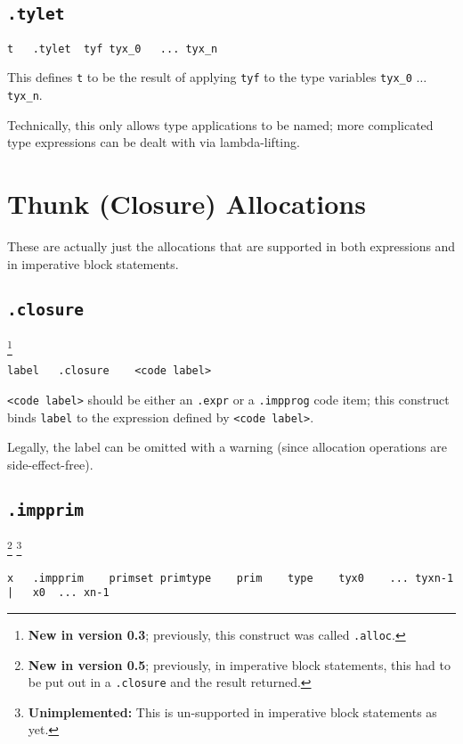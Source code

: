 \documentclass{report}
\newcommand\stringcode[1]{\texttt{#1}}
\newcommand\unimpl[1]{\footnote{\textbf{Unimplemented: }#1}}
\newcommand\new[2]{\footnote{\textbf{New in version #1}; previously, #2}}
\begin{document}
\subsection{\stringcode{.tylet}}

\begin{verbatim}
t	.tylet	tyf	tyx_0	...	tyx_n
\end{verbatim}

This defines \stringcode{t} to be the result of applying \stringcode{tyf} to the type variables \stringcode{tyx\_0} $\ldots$ \stringcode{tyx\_n}.

Technically, this only allows type applications to be named;
more complicated type expressions can be dealt with via lambda-lifting.

\section{Thunk (Closure) Allocations}
\label{thunk_alloc}

These are actually just the allocations that are supported in both expressions and in imperative block statements.

\subsection{\stringcode{.closure}}
\new{0.3}{this construct was called \stringcode{.alloc}.}

\begin{verbatim}
label	.closure	<code label>
\end{verbatim}

\stringcode{<code label>} should be either an \stringcode{.expr} or a \stringcode{.impprog} code item;
this construct binds \stringcode{label} to the expression defined by \stringcode{<code label>}.

Legally, the label can be omitted with a warning (since allocation operations are side-effect-free).

\subsection{\stringcode{.impprim}}
\new{0.5}{in imperative block statements, this had to be put out in a \stringcode{.closure} and the result returned.}
\unimpl{This is un-supported in imperative block statements as yet.}

\begin{verbatim}
x	.impprim	primset	primtype	prim	type	tyx0	...	tyxn-1	|	x0	...	xn-1
\end{verbatim}
\end{document}
